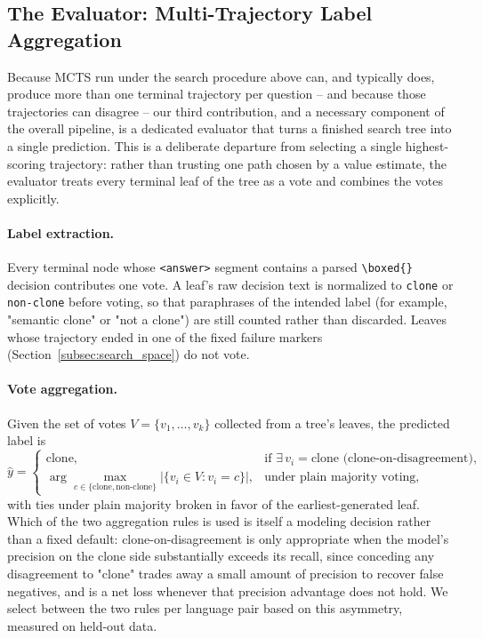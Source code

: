\subsection{The Evaluator: Multi-Trajectory Label Aggregation}
\label{subsec:evaluator}

Because MCTS run under the search procedure above can, and typically does,
produce more than one terminal trajectory per question -- and because those
trajectories can disagree -- our third contribution, and a necessary
component of the overall pipeline, is a dedicated evaluator that turns a
finished search tree into a single prediction. This is a deliberate departure
from selecting a single highest-scoring trajectory: rather than trusting one
path chosen by a value estimate, the evaluator treats every terminal leaf of
the tree as a vote and combines the votes explicitly.

\paragraph{Label extraction.} Every terminal node whose \texttt{<answer>}
segment contains a parsed \verb|\boxed{}| decision contributes one vote. A
leaf's raw decision text is normalized to \texttt{clone} or \texttt{non-clone}
before voting, so that paraphrases of the intended label (for example,
"semantic clone" or "not a clone") are still counted rather than discarded.
Leaves whose trajectory ended in one of the fixed failure markers
(Section~\ref{subsec:search_space}) do not vote.

\paragraph{Vote aggregation.} Given the set of votes $V = \{v_1, \ldots,
v_k\}$ collected from a tree's leaves, the predicted label is
\[
    \hat{y} =
    \begin{cases}
        \text{clone}, & \text{if } \exists\, v_i = \text{clone} \text{ (clone-on-disagreement)}, \\[4pt]
        \displaystyle\arg\max_{c \in \{\text{clone},\text{non-clone}\}}
        \bigl|\{v_i \in V : v_i = c\}\bigr|,
        & \text{under plain majority voting},
    \end{cases}
\]
with ties under plain majority broken in favor of the earliest-generated
leaf. Which of the two aggregation rules is used is itself a modeling
decision rather than a fixed default: clone-on-disagreement is only
appropriate when the model's precision on the clone side substantially
exceeds its recall, since conceding any disagreement to "clone" trades away
a small amount of precision to recover false negatives, and is a net loss
whenever that precision advantage does not hold. We select between the two
rules per language pair based on this asymmetry, measured on
held-out data.

